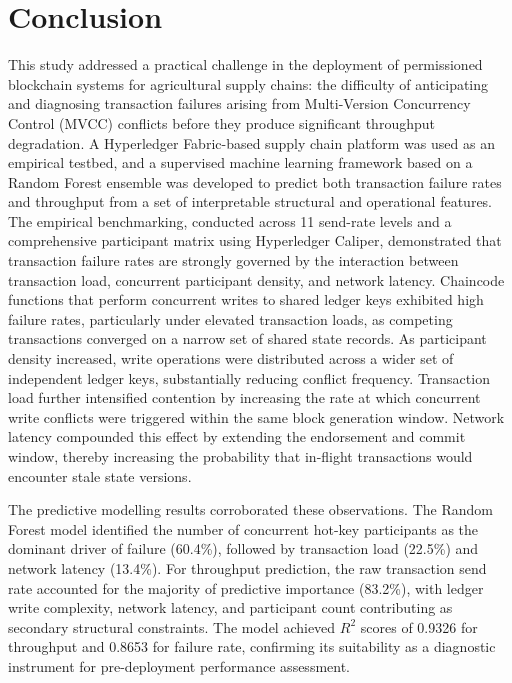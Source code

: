 \documentclass[12pt]{article}
\begin{document}
\section{Conclusion}

This study addressed a practical challenge in the deployment of permissioned blockchain systems for agricultural supply chains: the difficulty of anticipating and diagnosing transaction failures arising from Multi-Version Concurrency Control (MVCC) conflicts before they produce significant throughput degradation. A Hyperledger Fabric-based supply chain platform was used as an empirical testbed, and a supervised machine learning framework based on a Random Forest ensemble was developed to predict both transaction failure rates and throughput from a set of interpretable structural and operational features. The empirical benchmarking, conducted across 11 send-rate levels and a comprehensive participant matrix using Hyperledger Caliper, demonstrated that transaction failure rates are strongly governed by the interaction between transaction load, concurrent participant density, and network latency. Chaincode functions that perform concurrent writes to shared ledger keys exhibited high failure rates, particularly under elevated transaction loads, as competing transactions converged on a narrow set of shared state records. As participant density increased, write operations were distributed across a wider set of independent ledger keys, substantially reducing conflict frequency. Transaction load further intensified contention by increasing the rate at which concurrent write conflicts were triggered within the same block generation window. Network latency compounded this effect by extending the endorsement and commit window, thereby increasing the probability that in-flight transactions would encounter stale state versions.

The predictive modelling results corroborated these observations. The Random Forest model identified the number of concurrent hot-key participants as the dominant driver of failure (60.4\%), followed by transaction load (22.5\%) and network latency (13.4\%). For throughput prediction, the raw transaction send rate accounted for the majority of predictive importance (83.2\%), with ledger write complexity, network latency, and participant count contributing as secondary structural constraints. The model achieved $R^2$ scores of 0.9326 for throughput and 0.8653 for failure rate, confirming its suitability as a diagnostic instrument for pre-deployment performance assessment.
\end{document}

